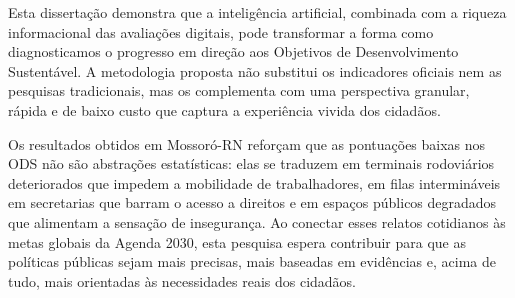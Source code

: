 Esta dissertação demonstra que a inteligência artificial, combinada com a riqueza informacional das avaliações digitais, pode transformar a forma como diagnosticamos o progresso em direção aos Objetivos de Desenvolvimento Sustentável. A metodologia proposta não substitui os indicadores oficiais nem as pesquisas tradicionais, mas os complementa com uma perspectiva granular, rápida e de baixo custo que captura a experiência vivida dos cidadãos.

Os resultados obtidos em Mossoró-RN reforçam que as pontuações baixas nos ODS não são abstrações estatísticas: elas se traduzem em terminais rodoviários deteriorados que impedem a mobilidade de trabalhadores, em filas intermináveis em secretarias que barram o acesso a direitos e em espaços públicos degradados que alimentam a sensação de insegurança. Ao conectar esses relatos cotidianos às metas globais da Agenda 2030, esta pesquisa espera contribuir para que as políticas públicas sejam mais precisas, mais baseadas em evidências e, acima de tudo, mais orientadas às necessidades reais dos cidadãos.
